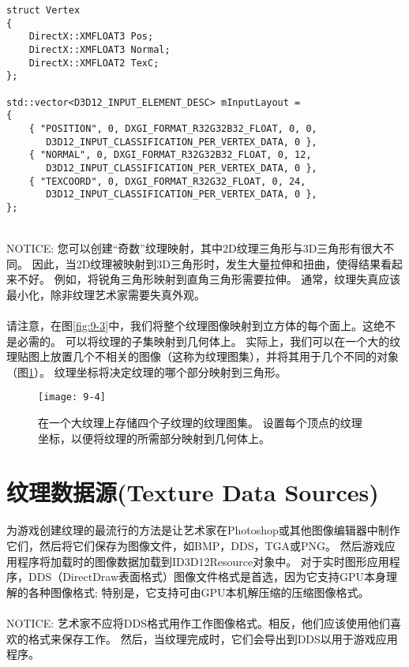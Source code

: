 \begin{lstlisting}
struct Vertex
{
    DirectX::XMFLOAT3 Pos;
    DirectX::XMFLOAT3 Normal;
    DirectX::XMFLOAT2 TexC;
};

std::vector<D3D12_INPUT_ELEMENT_DESC> mInputLayout =
{
    { "POSITION", 0, DXGI_FORMAT_R32G32B32_FLOAT, 0, 0,
       D3D12_INPUT_CLASSIFICATION_PER_VERTEX_DATA, 0 },
    { "NORMAL", 0, DXGI_FORMAT_R32G32B32_FLOAT, 0, 12,
       D3D12_INPUT_CLASSIFICATION_PER_VERTEX_DATA, 0 },
    { "TEXCOORD", 0, DXGI_FORMAT_R32G32_FLOAT, 0, 24,
       D3D12_INPUT_CLASSIFICATION_PER_VERTEX_DATA, 0 },
};
\end{lstlisting}

\begin{flushleft}
~\\
NOTICE: 您可以创建“奇数”纹理映射，其中2D纹理三角形与3D三角形有很大不同。 因此，当2D纹理被映射到3D三角形时，发生大量拉伸和扭曲，使得结果看起来不好。 例如，将锐角三角形映射到直角三角形需要拉伸。 通常，纹理失真应该最小化，除非纹理艺术家需要失真外观。\\
~\\
请注意，在图\ref{fig:9-3}中，我们将整个纹理图像映射到立方体的每个面上。这绝不是必需的。 可以将纹理的子集映射到几何体上。 实际上，我们可以在一个大的纹理贴图上放置几个不相关的图像（这称为纹理图集），并将其用于几个不同的对象（图\ref{fig:9-4}）。 纹理坐标将决定纹理的哪个部分映射到三角形。\\
\end{flushleft}

\begin{figure}[h]
    \label{fig:9-4}
    \texttt{[image: 9-4]}
    \centering
    \caption{在一个大纹理上存储四个子纹理的纹理图集。 设置每个顶点的纹理坐标，以便将纹理的所需部分映射到几何体上。}
\end{figure}

\section{纹理数据源(Texture Data Sources)}
\begin{flushleft}
为游戏创建纹理的最流行的方法是让艺术家在Photoshop或其他图像编辑器中制作它们，然后将它们保存为图像文件，如BMP，DDS，TGA或PNG。 然后游戏应用程序将加载时的图像数据加载到ID3D12Resource对象中。 对于实时图形应用程序，DDS（DirectDraw表面格式）图像文件格式是首选，因为它支持GPU本身理解的各种图像格式; 特别是，它支持可由GPU本机解压缩的压缩图像格式。\\
~\\
NOTICE: 艺术家不应将DDS格式用作工作图像格式。相反，他们应该使用他们喜欢的格式来保存工作。 然后，当纹理完成时，它们会导出到DDS以用于游戏应用程序。
~\\
\end{flushleft}

